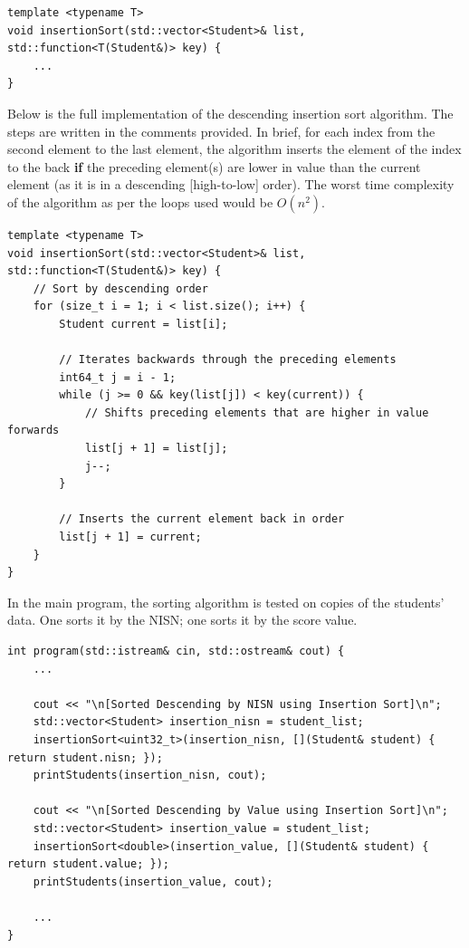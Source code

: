 \documentclass[12pt]{article}
\begin{document}
\begin{verbatim}
template <typename T>
void insertionSort(std::vector<Student>& list, std::function<T(Student&)> key) {
    ...
}
\end{verbatim}

Below is the full implementation of the descending insertion sort algorithm. The steps are written in the comments provided. In brief, for each index from the second element to the last element, the algorithm inserts the element of the index to the back \textbf{if} the preceding element(s) are lower in value than the current element (as it is in a descending [high-to-low] order). The worst time complexity of the algorithm as per the loops used would be $O(n^2)$.

\begin{verbatim}
template <typename T>
void insertionSort(std::vector<Student>& list, std::function<T(Student&)> key) {
    // Sort by descending order
    for (size_t i = 1; i < list.size(); i++) {
        Student current = list[i];

        // Iterates backwards through the preceding elements
        int64_t j = i - 1;
        while (j >= 0 && key(list[j]) < key(current)) {
            // Shifts preceding elements that are higher in value forwards
            list[j + 1] = list[j];
            j--;
        }

        // Inserts the current element back in order
        list[j + 1] = current;
    }
}
\end{verbatim}

In the main program, the sorting algorithm is tested on copies of the students' data. One sorts it by the NISN; one sorts it by the score value.

\begin{verbatim}
int program(std::istream& cin, std::ostream& cout) {
    ...

    cout << "\n[Sorted Descending by NISN using Insertion Sort]\n";
    std::vector<Student> insertion_nisn = student_list;
    insertionSort<uint32_t>(insertion_nisn, [](Student& student) { return student.nisn; });
    printStudents(insertion_nisn, cout);

    cout << "\n[Sorted Descending by Value using Insertion Sort]\n";
    std::vector<Student> insertion_value = student_list;
    insertionSort<double>(insertion_value, [](Student& student) { return student.value; });
    printStudents(insertion_value, cout);

    ...
}
\end{verbatim}
\end{document}
